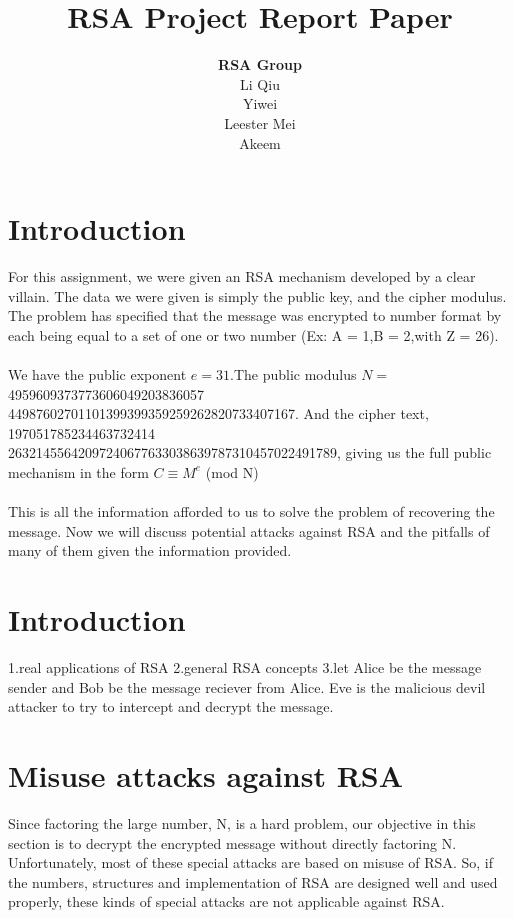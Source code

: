 \documentclass[12pt]{article} %
\title{RSA Project Report Paper}
\author{\textbf{RSA Group}\\Li Qiu\\Yiwei \\Leester Mei\\Akeem}
\begin{document}
\maketitle



\section{Introduction}
For this assignment, we were given an RSA mechanism developed by a clear villain. The data we were given is simply the public key, and the cipher modulus. The problem has specified that the message was encrypted to number format by each being equal to a set of one or two number (Ex: A = 1,B = 2,with Z = 26).
\\\\
We have the public exponent $ e = 31 $.The public modulus $N=$  4959609373773606049203836057\\44987602701101399399359259262820733407167.
And the cipher text, 197051785234463732414\\26321455642097240677633038639787310457022491789, giving us the full public mechanism in the form $ C \equiv M^{e} $ (mod N) 
\\\\
\indent This is all the information afforded to us to solve the problem of recovering the message. Now we will discuss potential attacks against RSA and the pitfalls of many of them given the information provided.

\section{Introduction}
    1.real applications of RSA
	2.general RSA concepts
	3.let Alice be the message sender and Bob be the message reciever from Alice.
	Eve is the malicious devil attacker to try to intercept and decrypt the message. 
\section{Misuse attacks against RSA}
	Since factoring the large number, N, is a hard problem, our objective in this section is to decrypt the encrypted message without directly factoring N.
	Unfortunately, most of these special attacks are based on misuse of RSA.
	So, if the numbers, structures and implementation of RSA are designed well and used properly, these kinds of special attacks are not applicable against RSA.
\end{document}
